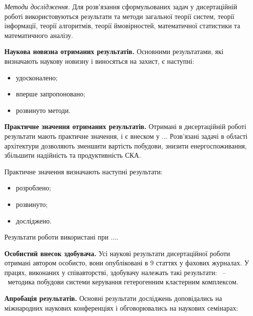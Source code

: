\textit{Методи дослідження.} Для розв'язання сформульованих задач у дисертаційній роботі використовуються результати та методи загальної теорії систем, теорії інформації, теорії алгоритмів, теорії ймовірностей, математичної статистики та математичного аналізу.

\textbf{Наукова новизна отриманих результатів.}
Основними результатами, які визначають наукову новизну і виносяться на захист, є наступні:

\begin{itemize}
\item удосконалено;
\item вперше запропоновано;
\item розвинуто методи.
\end{itemize}


\textbf{Практичне значення отриманих результатів.}
Отримані в дисертаційній роботі результати мають практичне значення, і є внеском у ... Розв'язані задачі в області архітектури дозволяють зменшити вартість побудови, знизити енергоспоживання, збільшити надійність та продуктивність СКА.

Практичне значення визначають наступні результати:

\begin{itemize}
\item розроблено; 
\item розвинуто;
\item досліджено.
\end{itemize}

Результати роботи використані при ....

\nocite{getero-art,getero-taganrog-art,supercomp-architecture-art,security-art,boib-art,srp-art,portal-art,web,web-portal} 
\nocite{supercomp-architecture-proceed,policy,50anniv-art,steking,cluster-grid-management-system,cluster-stats,transport,web-portal-abrau,hpcua-scheduling,hpcua-gpu,scms-congress2011}

\textbf{Особистий внесок здобувача.}
Усі наукові результати дисертаційної роботи отримані автором особисто, вони опубліковані в 9 статтях у фахових журналах. У працях, виконаних у співавторстві, здобувачу належать такі результати: \cite{getero-art,getero-taganrog-art}~--~методика побудови системи керування гетерогенним кластерним комплексом.


\textbf{Апробація результатів.}
Основні результати досліджень доповідались на міжнародних наукових конференціях і обговорювались на наукових семінарах: 


